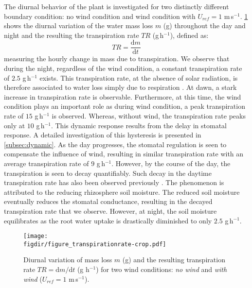 The diurnal behavior of the plant is investigated for two distinctly different boundary condition: no wind condition and wind condition with $U_{ref}=1$ m\,s$^{-1}$. \cref{fig:figure_transpirationrate} shows the diurnal variation of the water mass loss $m$ (g) throughout the day and night and the resulting the transpiration rate $TR$ (g\,h$^{-1}$), defined as:
\begin{equation}
TR = \frac{\mathrm{d}m}{\mathrm{d}t}
\end{equation}
measuring the hourly change in mass due to transpiration. We observe that during the night, regardless of the wind condition, a constant transpiration rate of $2.5$ g\,h$^{-1}$ exists. This transpiration rate, at the absence of solar radiation, is therefore associated to water loss simply due to respiration \citep{Farquhar1980, Lambers2008, Launiainen2015}. At dawn, a stark increase in transpiration rate is observable. Furthermore, at this time, the wind condition plays an important role as during wind condition, a peak transpiration rate of $15$ g\,h$^{-1}$ is observed. Whereas, without wind, the transpiration rate peaks only at $10$ g\,h$^{-1}$. This dynamic response results from the delay in stomatal response. A detailed investigation of this hysteresis is presented in \cref{subsec:dynamic}. As the day progresses, the stomatal regulation is seen to compensate the influence of wind, resulting in similar transpiration rate with an average transpiration rate of $9$ g\,h$^{-1}$. However, by the course of the day, the transpiration is seen to decay quantifiably. Such decay in the daytime transpiration rate has also been observed previously \citep{Javaux2013, Tuzet2003}. The phenomenon is attributed to the reducing rhizosphere soil moisture. The reduced soil moisture eventually reduces the stomatal conductance, resulting in the decayed transpiration rate that we observe. However, at night, the soil moisture equilibrates as the root water uptake is drastically diminished to only $2.5$ g\,h$^{-1}$. 

	\begin{figure}[t]
	\centering
	\texttt{[image: \\figdir/figure\_transpirationrate-crop.pdf]}
	\caption{Diurnal variation of mass loss $m$ (g) and the resulting transpiration rate $TR=\mathrm{d}m/\mathrm{d}t$ (g h$^{-1}$) for two wind conditions: \textit{no wind} and \textit{with wind} ($U_{ref}=1$ m\,s$^{-1}$).}
	\label{fig:figure_transpirationrate}
	\end{figure}

